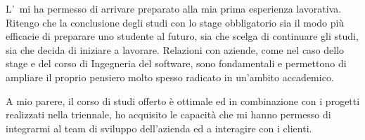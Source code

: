 L'\myUni\ mi ha permesso di arrivare preparato alla mia prima esperienza lavorativa. Ritengo che la conclusione degli studi con lo stage obbligatorio sia il modo più efficacie di preparare uno studente al futuro, sia che scelga di continuare gli studi, sia che decida di iniziare a lavorare. Relazioni con aziende, come nel caso dello stage e del corso di Ingegneria del software, sono fondamentali e permettono di ampliare il proprio pensiero molto spesso radicato in un'ambito accademico. 

A mio parere, il corso di studi offerto è ottimale ed in combinazione con i progetti realizzati nella triennale, ho acquisito le capacità che mi hanno permesso di integrarmi al team di sviluppo dell'azienda ed a interagire con i clienti. 
 